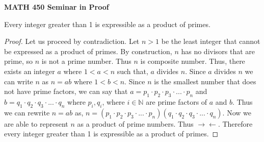 \documentclass[12pt, fullpage]{article}
\newcommand{\N}{\mathbb N}
\begin{document}
\begin{center}
		
{\bf MATH 450 Seminar in Proof}
 \\
\end{center}
	Every integer greater than 1 is expressible as a product of primes.
\begin{proof}
	Let us proceed by contradiction. Let $n > 1$ be the least integer that cannot be expressed as a product of primes. By construction, $n$ has no divisors that are prime, so $n$ is not a prime number. Thus $n$ is composite number. Thus, there exists an integer $a$ where $1 < a < n$ such that, $a$ divides $n$. Since $a$ divides $n$ we can write $n$ as $n = ab$ where $1<b<n$. Since $n$ is the smallest number that does not have prime factors, we can say that $a = p_1 \cdot p_2 \cdot p_3 \cdot ... \cdot p_n$ and $b = q_1 \cdot q_2 \cdot q_3 \cdot ... \cdot q_n$ where $p_i, q_i$, where $i \in \N$ are prime factors of $a$ and $b$. Thus we can rewrite $n = ab$ as, $n = (p_1 \cdot p_2 \cdot p_3 \cdot ... \cdot p_n)(q_1 \cdot q_2 \cdot q_3 \cdot ... \cdot q_n)$. Now we are able to represent $n$ as a product of prime numbers. Thus $\rightarrow\leftarrow$. Therefore every integer greater than 1 is expressible as a product of primes.
\end{proof}
\end{document}
